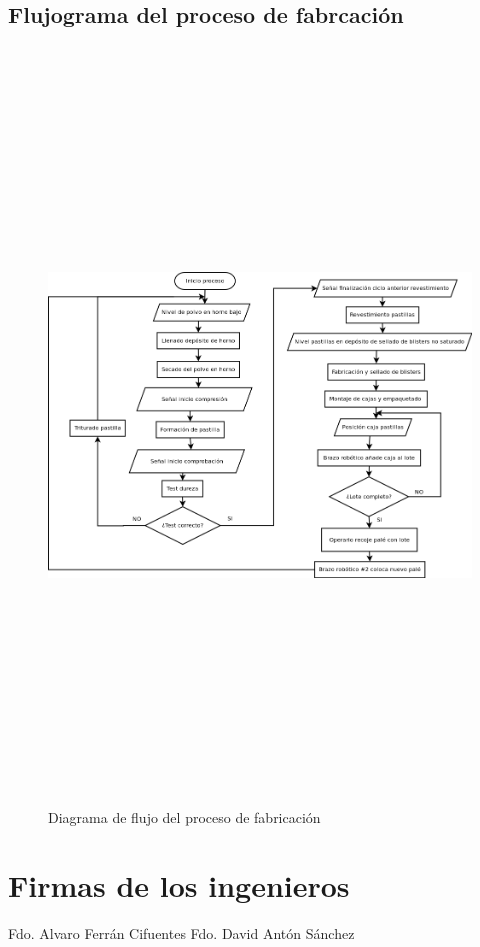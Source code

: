 \subsection{Flujograma del proceso de fabrcación}

\begin{figure}[htp]
			\centering
			\includegraphics[width=15cm,height=20cm,keepaspectratio]{Planos/Flujograma.png}
			\caption{Diagrama de flujo del proceso de fabricación}
			\label{fig:testa}
	\end{figure}


\newpage\section {Firmas de los ingenieros}
\vspace{5cm}
Fdo. Alvaro Ferrán Cifuentes
\vspace{5cm}\hspace{5cm}
Fdo. David Antón Sánchez

